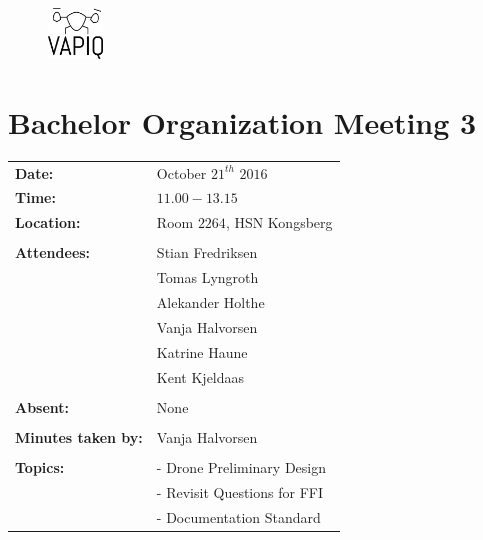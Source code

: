 \documentclass{article}
\begin{document}
\begin{figure}
\begin{center}
\includegraphics[width=0.13\textwidth]{VAPIQ-PICTURES/Logo2_Tilted.png} %
\advance{}
\end{center}
\end{figure}

\section*{Bachelor Organization Meeting 3}   

\begin{tabular}{ll}                                         
\textbf{Date:} 	            & October $21^{th}$ $2016$	    \\
\textbf{Time:}	        	& $11.00-13.15$				    \\
\textbf{Location:}       	& Room $2264$, HSN Kongsberg    \\\\
\textbf{Attendees:}         & Stian Fredriksen			    \\
				        	& Tomas Lyngroth			    \\  
				        	& Alekander Holthe 		    	\\
				        	& Vanja Halvorsen		    	\\
				        	& Katrine Haune 		    	\\
				        	& Kent Kjeldaas                 \\\\
\textbf{Absent:}		    & None 						    \\\\
\textbf{Minutes taken by:}	& Vanja Halvorsen		        \\\\
\textbf{Topics:}	        & - Drone Preliminary Design         \\
				        	& - Revisit Questions for FFI        \\  
				        	& - Documentation Standard           \\ 
\end{tabular}                                                    \\\\\\
\end{document}
